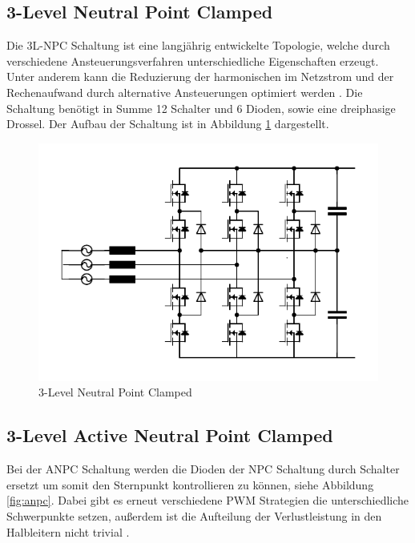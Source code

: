 	\subsection{3-Level Neutral Point Clamped}
		Die 3L-NPC Schaltung ist eine langjährig entwickelte Topologie, welche durch verschiedene Ansteuerungsverfahren unterschiedliche Eigenschaften erzeugt. Unter anderem kann die Reduzierung der harmonischen im Netzstrom und der Rechenaufwand durch alternative Ansteuerungen optimiert werden \cite{NPC}. Die Schaltung benötigt in Summe 12 Schalter und 6 Dioden, sowie eine dreiphasige Drossel. Der Aufbau der Schaltung ist in Abbildung \ref{fig:3l-npc} dargestellt.
		\begin{figure}[H]
			\centering
			\includegraphics[width=0.9\linewidth]{content/Grafiken/3L-NPC}
			\caption{3-Level Neutral Point Clamped}
			\label{fig:3l-npc}
		\end{figure}

	\subsection{3-Level Active Neutral Point Clamped}
		Bei der ANPC Schaltung werden die Dioden der NPC Schaltung durch Schalter ersetzt um somit den Sternpunkt kontrollieren zu können, siehe Abbildung \ref{fig:anpc}. Dabei gibt es erneut verschiedene \gls{PWM} Strategien die unterschiedliche Schwerpunkte setzen, außerdem ist die Aufteilung der Verlustleistung in den Halbleitern nicht trivial \cite{ANPC}.
	
